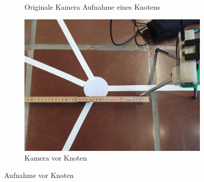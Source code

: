 \begin{enumerate}
\begin{figure}[H]
\begin{subfigure}{0.25\textwidth}
        \caption{Originale Kamera Aufnahme eines Knotens}
        \label{fig:before-node}
        \end{subfigure}
        \begin{subfigure}{0.5\textwidth}
        \includegraphics[width=0.95\linewidth]{assets/informatik-prototyp/opencv/camera_position_before_node.jpg} 
        \caption{Kamera vor Knoten}
        \label{fig:before-node-camera}
        \vspace{5mm}
        \end{subfigure}
        \caption{Aufnahme vor Knoten}
        \label{fig:image-before-node}
        \end{figure}


\end{enumerate}
